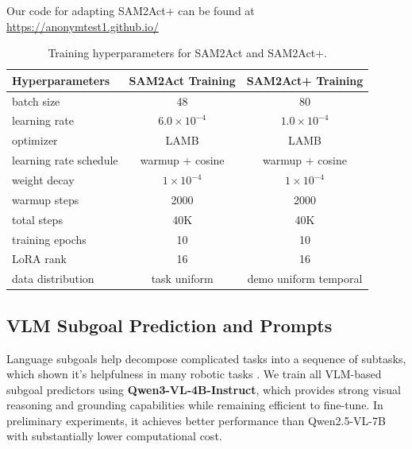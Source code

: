 Our code for adapting SAM2Act+ can be found at \url{https://anonymtest1.github.io/}

\begin{table}[h]
\centering
\small
\caption{Training hyperparameters for SAM2Act and SAM2Act+.}
\label{tab:sam2actplus_train_hparams}
\begin{tabular}{lcc}
\toprule
\textbf{Hyperparameters} & \textbf{SAM2Act Training} & \textbf{SAM2Act+ Training} \\
\midrule
batch size  & 48 & 80 \\
learning rate & $6.0\times10^{-4}$ & $1.0\times10^{-4}$ \\
optimizer & LAMB  & LAMB \\
learning rate schedule & warmup + cosine & warmup + cosine \\
weight decay & $1\times10^{-4}$ & $1\times10^{-4}$ \\
warmup steps & 2000 & 2000 \\
total steps & 40K & 40K \\
training epochs & 10 & 10 \\
LoRA rank & 16 & 16 \\
data distribution & task uniform & demo uniform temporal\\
\bottomrule
\end{tabular}
\end{table}





\clearpage
\subsection{VLM Subgoal Prediction and Prompts}
\label{sec:VLM_subgoal}

Language subgoals help decompose complicated tasks into a sequence of subtasks, which shown it's helpfulness in many robotic tasks \cite{dai2025racer, lin2026systematic, dai2024think}. 
We train all VLM-based subgoal predictors using \textbf{Qwen3-VL-4B-Instruct}, which provides strong visual reasoning and grounding capabilities while remaining efficient to fine-tune. In preliminary experiments, it achieves better performance than Qwen2.5-VL-7B with substantially lower computational cost.

